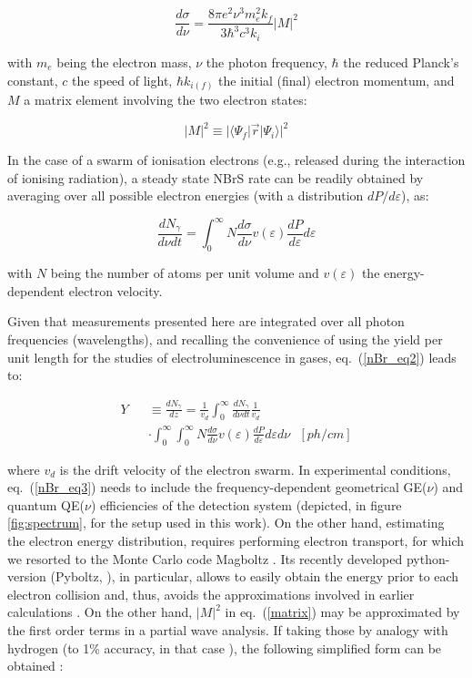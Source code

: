 \documentclass[%
 reprint,
superscriptaddress,
 amsmath,amssymb,
 aps,
]{revtex4-2}
\begin{document}
\begin{equation}
\frac{d\sigma}{d\nu} = \frac{8 \pi e^2 \nu^3 m_e^2 k_f}{3 \hbar^3 c^3 k_i} |M|^2
\label{nBr_eq}
\end{equation}

\noindent with $m_e$ being the electron mass, $\nu$ the photon frequency, $\hbar$ the reduced Planck's constant, $c$ the speed of light, ${\hbar}k_{i(f)}$ the initial (final) electron momentum, and $M$ a matrix element involving the two electron states:

\begin{equation}
|M|^2 \equiv |\langle \Psi_f|\vec{r}|\Psi_i \rangle|^2 
\label{matrix}
\end{equation}

In the case of a swarm of ionisation electrons (e.g., released during the interaction of ionising radiation), a steady state NBrS rate can be readily obtained by averaging over all possible electron energies (with a distribution $dP/d{\varepsilon}$), as:  


\begin{equation}
\frac{dN_\gamma}{d\nu dt} = \int_0^{\infty} N \frac{d\sigma}{d\nu} v(\varepsilon) \frac{dP}{d\varepsilon} d{\varepsilon} 
\label{nBr_eq2}
\end{equation}

\noindent with $N$ being the number of atoms per unit volume and $v(\varepsilon)$ the energy-dependent electron velocity. 

Given that measurements presented here are integrated over all photon frequencies (wavelengths), and recalling the convenience of using the yield per unit length for the studies of electroluminescence in gases, eq.~(\ref{nBr_eq2}) leads to:

\begin{eqnarray}
Y && \equiv \frac{dN_\gamma}{dz} 
= \frac{1}{v_d} \int_0^{\infty} \frac{dN_\gamma}{d\nu dt} \frac{1}{v_d} \nonumber \\
&&\cdot 
\int_0^{\infty}\int_0^{\infty} N \frac{d\sigma}{d\nu} v(\varepsilon) \frac{dP}{d\varepsilon} d{\varepsilon} d{\nu}~~~ [{ph/cm}]
\label{nBr_eq3}
\end{eqnarray}

\noindent where $v_d$ is the drift velocity of the electron swarm. In experimental conditions, eq.~(\ref{nBr_eq3}) needs to include the frequency-dependent geometrical GE($\nu$) and quantum QE($\nu$) efficiencies of the detection system (depicted, in figure \ref{fig:spectrum}, for the setup used in this work). On the other hand, estimating the electron energy distribution, requires performing electron transport, for which we resorted to the Monte Carlo code Magboltz \cite{Magboltz}. Its recently developed python-version (Pyboltz, \cite{Pyboltz}), in particular, allows to easily obtain the energy prior to each electron collision and, thus, avoids the approximations involved in earlier calculations \cite{34}. On the other hand, $|M|^2$ in eq.~(\ref{matrix}) may be approximated by the first order terms in a partial wave analysis. If taking those by analogy with hydrogen (to 1\% accuracy, in that case \cite{Ohmura}), the following simplified form can be obtained \cite{Dalgarno}:
\end{document}
